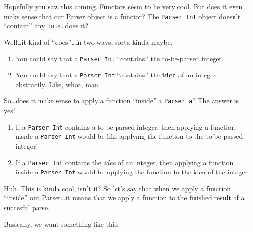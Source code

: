 \documentclass[]{article}
\newenvironment{Shaded}{}{}
\newcommand{\KeywordTok}[1]{\textcolor[rgb]{0.00,0.44,0.13}{\textbf{{#1}}}}
\newcommand{\DataTypeTok}[1]{\textcolor[rgb]{0.56,0.13,0.00}{{#1}}}
\newcommand{\DecValTok}[1]{\textcolor[rgb]{0.25,0.63,0.44}{{#1}}}
\newcommand{\StringTok}[1]{\textcolor[rgb]{0.25,0.44,0.63}{{#1}}}
\newcommand{\OtherTok}[1]{\textcolor[rgb]{0.00,0.44,0.13}{{#1}}}
\newcommand{\FunctionTok}[1]{\textcolor[rgb]{0.02,0.16,0.49}{{#1}}}
\newcommand{\NormalTok}[1]{{#1}}
\begin{document}
Hopefully you saw this coming. Functors seem to be very cool. But does
it even make sense that our Parser object is a functor? The
\texttt{Parser\ Int} object doesn't ``contain'' any
\texttt{Int}s\ldots{}does it?

Well\ldots{}it kind of ``does''\ldots{}in two ways, sorta kinda maybe.

\begin{enumerate}
\def\labelenumi{\arabic{enumi}.}
\tightlist
\item
  You could say that a \texttt{Parser\ Int} ``contains'' the
  to-be-parsed integer.
\item
  You could say that a \texttt{Parser\ Int} ``contains'' the
  \textbf{idea} of an integer\ldots{}abstractly. Like, whoa, man.
\end{enumerate}

So\ldots{}does it make sense to apply a function ``inside'' a
\texttt{Parser\ a}? The answer is yes!

\begin{enumerate}
\def\labelenumi{\arabic{enumi}.}
\tightlist
\item
  If a \texttt{Parser\ Int} contains a to-be-parsed integer, then
  applying a function inside a \texttt{Parser\ Int} would be like
  applying the function to the to-be-parsed integer!
\item
  If a \texttt{Parser\ Int} contains the \emph{idea} of an integer, then
  applying a function inside a \texttt{Parser\ Int} would be applying
  the function to the idea of the integer.
\end{enumerate}

Huh. This is kinda cool, isn't it? So let's say that when we apply a
function ``inside'' our Parser\ldots{}it means that we apply a function
to the finished result of a succesful parse.

Basically, we want something like this:

\begin{Shaded}
\end{Shaded}
\end{document}

